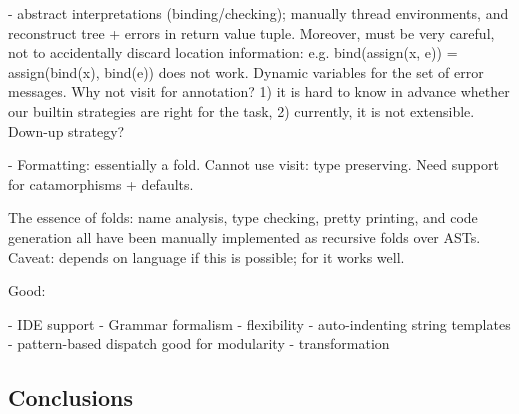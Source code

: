 - abstract interpretations (binding/checking); manually thread
environments, and reconstruct tree + errors in return value
tuple. Moreover, must be very careful, not to accidentally discard
location information: e.g. bind(assign(x, e)) = assign(bind(x),
bind(e)) does not work.  Dynamic variables for the set of error
messages. Why not visit for annotation? 1) it is hard to know in
advance whether our builtin strategies are right for the task, 2)
currently, it is not extensible. Down-up strategy?

- Formatting:
essentially a fold. Cannot use visit: type preserving. Need support
for catamorphisms + defaults.


The essence of folds: name analysis, type checking, pretty printing,
and code generation all have been manually implemented as recursive
folds over ASTs. Caveat: depends on language if this is possible; for
\oberon it works well.


Good:

- IDE support
- Grammar formalism
- flexibility
- auto-indenting string templates
- pattern-based dispatch good for modularity
- transformation

\subsection{Conclusions}
